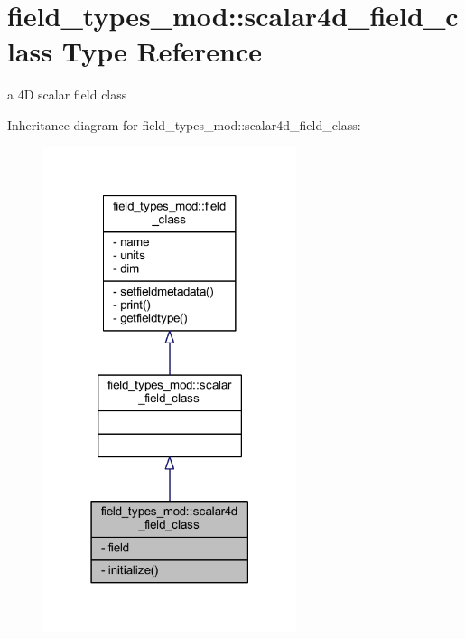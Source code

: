 \hypertarget{structfield__types__mod_1_1scalar4d__field__class}{}\section{field\+\_\+types\+\_\+mod\+:\+:scalar4d\+\_\+field\+\_\+class Type Reference}
\label{structfield__types__mod_1_1scalar4d__field__class}


a 4D scalar field class  




Inheritance diagram for field\+\_\+types\+\_\+mod\+:\+:scalar4d\+\_\+field\+\_\+class\+:\nopagebreak
\begin{figure}[H]
\begin{center}
\leavevmode
\includegraphics[width=210pt]{structfield__types__mod_1_1scalar4d__field__class__inherit__graph}
\end{center}
\end{figure}


